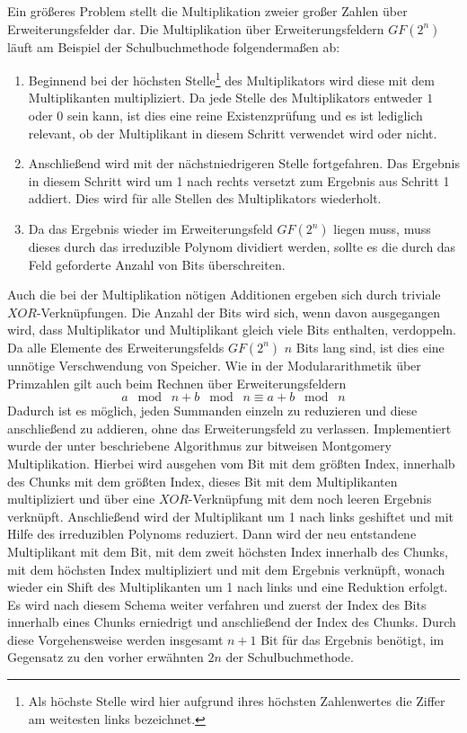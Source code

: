 {Ein größeres Problem stellt die Multiplikation zweier großer Zahlen über Erweiterungsfelder dar. Die Multiplikation über Erweiterungsfeldern $GF(2^n)$ läuft am Beispiel der Schulbuchmethode folgendermaßen ab:
\begin{enumerate}
\item Beginnend bei der höchsten Stelle\footnote{Als höchste Stelle wird hier aufgrund ihres höchsten Zahlenwertes die Ziffer am weitesten links bezeichnet.} des Multiplikators wird diese mit dem Multiplikanten multipliziert. Da jede Stelle des Multiplikators entweder $1$ oder $0$ sein kann, ist dies eine reine Existenzprüfung und es ist lediglich relevant, ob der Multiplikant in diesem Schritt verwendet wird oder nicht.
\item Anschließend wird mit der nächstniedrigeren Stelle fortgefahren. Das Ergebnis in diesem Schritt wird um 1 nach rechts versetzt zum Ergebnis aus Schritt 1 addiert. Dies wird für alle Stellen des Multiplikators wiederholt. 
\item Da das Ergebnis wieder im Erweiterungsfeld $GF(2^n)$ liegen muss, muss dieses durch das irreduzible Polynom dividiert werden, sollte es die durch das Feld geforderte Anzahl von Bits überschreiten.
\end{enumerate}
Auch die bei der Multiplikation nötigen Additionen ergeben sich durch triviale $XOR$-Verknüpfungen. Die Anzahl der Bits wird sich, wenn davon ausgegangen wird, dass Multiplikator und Multiplikant gleich viele Bits enthalten, verdoppeln. Da alle Elemente des Erweiterungsfelds $GF(2^n)$ $n$ Bits lang sind, ist dies eine unnötige Verschwendung von Speicher. Wie in der Modulararithmetik über Primzahlen gilt auch beim Rechnen über Erweiterungsfeldern
$$
a \;\bmod\; n + b \;\bmod\; n \equiv a + b \;\bmod\; n
$$
Dadurch ist es möglich, jeden Summanden einzeln zu reduzieren und diese anschließend zu addieren, ohne das Erweiterungsfeld zu verlassen. Implementiert wurde der unter \cite{Cetin:1998} beschriebene Algorithmus zur bitweisen Montgomery Multiplikation. Hierbei wird ausgehen vom Bit mit dem größten Index, innerhalb des Chunks mit dem größten Index, dieses Bit mit dem Multiplikanten multipliziert und über eine $XOR$-Verknüpfung mit dem noch leeren Ergebnis verknüpft. Anschließend wird der Multiplikant um 1 nach links geshiftet und mit Hilfe des irreduziblen Polynoms reduziert. Dann wird der neu entstandene Multiplikant mit dem Bit, mit dem zweit höchsten Index innerhalb des Chunks, mit dem höchsten Index multipliziert und mit dem Ergebnis verknüpft, wonach wieder ein Shift des Multiplikanten um 1 nach links und eine Reduktion erfolgt. Es wird nach diesem Schema weiter verfahren und zuerst der Index des Bits innerhalb eines Chunks erniedrigt und anschließend der Index des Chunks. Durch diese Vorgehensweise werden insgesamt $n+1$ Bit für das Ergebnis benötigt, im Gegensatz zu den vorher erwähnten $2n$ der Schulbuchmethode.\newline
}
